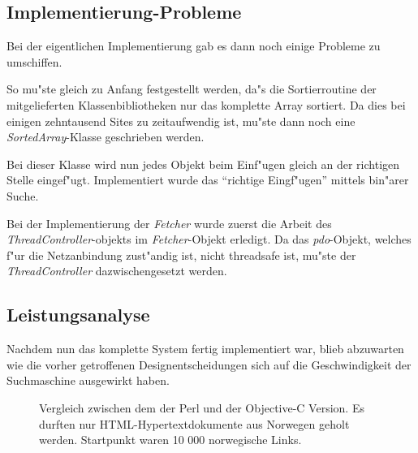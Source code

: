 \subsection{Implementierung-Probleme}

Bei der eigentlichen Implementierung gab es dann noch einige Probleme zu umschiffen.

So mu"ste gleich zu Anfang festgestellt werden, da"s die Sortierroutine der mitgelieferten Klassenbibliotheken nur das komplette Array sortiert. Da dies bei einigen zehntausend Sites zu zeitaufwendig ist, mu"ste dann noch eine {\em SortedArray}-Klasse geschrieben werden. 

Bei dieser Klasse wird nun jedes Objekt beim Einf"ugen gleich an der richtigen Stelle eingef"ugt. Implementiert wurde das "`richtige Eingf"ugen"' mittels bin"arer Suche.

Bei der Implementierung der {\em Fetcher} wurde zuerst die Arbeit des {\em Thread\-Con\-troller}-objekts im {\em Fetcher}-Objekt erledigt. Da das {\em pdo}-Objekt, welches f"ur die Netzanbindung zust"andig ist, nicht threadsafe ist, mu"ste der {\em ThreadController} dazwischengesetzt werden. 


\subsection{Leistungsanalyse}

Nachdem nun das komplette System fertig implementiert war, blieb abzuwarten wie die vorher getroffenen Designentscheidungen sich auf die Geschwindigkeit der Suchmaschine ausgewirkt haben.

\begin{figure}[t]
	\caption{Vergleich zwischen dem der Perl und der Objective-C Version. Es durften nur HTML-Hypertextdokumente aus Norwegen geholt werden. Startpunkt waren 10 000 norwegische Links.}
	\label{PerlVsObjC}
\end{figure}

